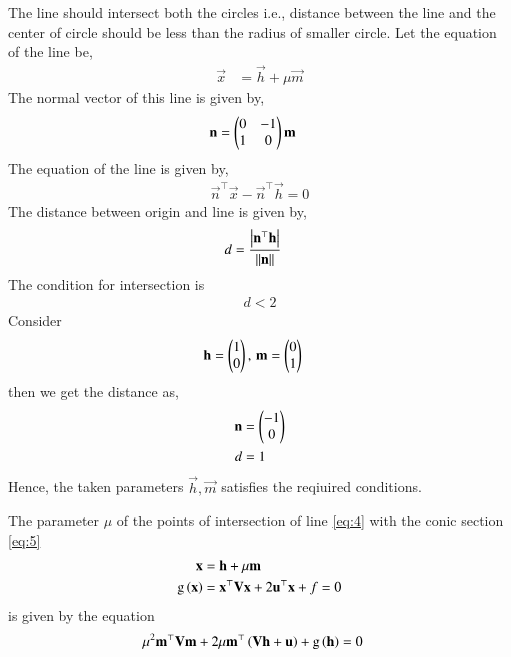 \documentclass[journal,12pt,twocolumn]{IEEEtran}
\begin{document}
\begin{enumerate}
The line should intersect both the circles i.e., distance between the line and the center of circle should be less than the radius of smaller circle. Let the equation of the line be,
\begin{align}
\vec{x} &= \vec{h} + \mu \vec{m}
\end{align}
The normal vector of this line is given by,
\begin{align}
\mathbf{n} &= \begin{pmatrix}0&-1\\1&0\end{pmatrix}\mathbf{m}
\end{align}
The equation of the line is given by,
\begin{align}
\vec{n}^\top\vec{x} - \vec{n}^\top\vec{h} = 0
\end{align}
The distance between origin and line is given by,
\begin{align}
d &= \frac{\left\vert\mathbf{n}^\top\mathbf{h}\right\vert}{\left\lVert\mathbf{n}\right\rVert}
\end{align}
The condition for intersection is
\begin{align}
d < 2
\end{align}
Consider
\begin{align}
\mathbf{h} = \begin{pmatrix}1\\0\end{pmatrix}, \, \mathbf{m} &= \begin{pmatrix}0\\1\end{pmatrix}
\end{align}
then we get the distance as,
\begin{align}
\mathbf{n} &= \begin{pmatrix}-1\\0\end{pmatrix}\\
d &= 1
\end{align}
Hence, the taken parameters $\vec{h}, \vec{m}$ satisfies the reqiuired conditions.

The parameter $\mu$ of the points of intersection of line \eqref{eq:4} with the conic section \eqref{eq:5}
\begin{align}
\mathbf{x} &= \mathbf{h} + \mu \mathbf{m}
\label{eq:4}\\
\text{g}\left(\mathbf{x}\right) &= \mathbf{x}^{\top}\mathbf{V}\mathbf{x}+2\mathbf{u}^{\top}\mathbf{x}+f=0
\label{eq:5}
\end{align}
is given by the equation 
\begin{align}
\mu^2\mathbf{m}^{\top}\mathbf{V}\mathbf{m} + 2 \mu\mathbf{m}^{\top}\left(\mathbf{V}\mathbf{h}+\mathbf{u}\right) 
	+ \text{g}\left(\mathbf{h}\right) &=0
\label{eq:6}
\end{align}



\end{enumerate}
\end{document}
